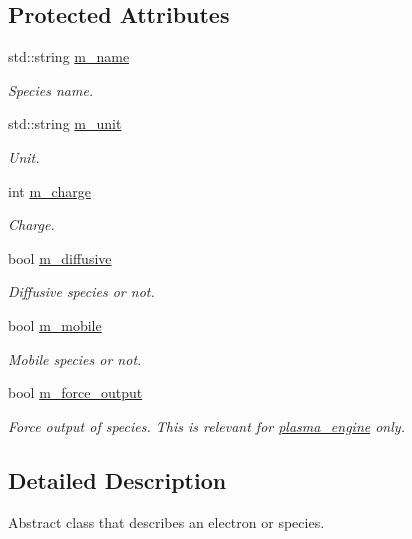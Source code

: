 \subsection*{Protected Attributes}
\begin{DoxyCompactItemize}
\item 
std\+::string \hyperlink{classspecies_aa1f69b1d67009b1a6751864fbc6b836a}{m\+\_\+name}
\begin{DoxyCompactList}\small\item\em Species name. \end{DoxyCompactList}\item 
std\+::string \hyperlink{classspecies_a93a6215695c7707db4eb72f5b29e3a0b}{m\+\_\+unit}
\begin{DoxyCompactList}\small\item\em Unit. \end{DoxyCompactList}\item 
int \hyperlink{classspecies_a8f2ae99fca97acacef3d0b39e2cd55a4}{m\+\_\+charge}
\begin{DoxyCompactList}\small\item\em Charge. \end{DoxyCompactList}\item 
bool \hyperlink{classspecies_aa90618b29da89992614e956b03b57a9b}{m\+\_\+diffusive}
\begin{DoxyCompactList}\small\item\em Diffusive species or not. \end{DoxyCompactList}\item 
bool \hyperlink{classspecies_ac319022ed7974425b7089fd131c0667d}{m\+\_\+mobile}
\begin{DoxyCompactList}\small\item\em Mobile species or not. \end{DoxyCompactList}\item 
bool \hyperlink{classspecies_ae2426a6b34439c3b7e2432d09361a518}{m\+\_\+force\+\_\+output}
\begin{DoxyCompactList}\small\item\em Force output of species. This is relevant for \hyperlink{classplasma__engine}{plasma\+\_\+engine} only. \end{DoxyCompactList}\end{DoxyCompactItemize}


\subsection{Detailed Description}
Abstract class that describes an electron or species. 

